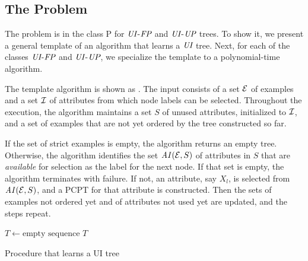 \vspace{-0.1cm}
\subsection{The  Problem}
\vspace{-0.1cm}

The  problem is in the class P for $\textit{UI}$-$\textit{FP}$ and
$\textit{UI}$-$\textit{UP}$ trees. To show it, we present a general template of an 
algorithm that learns a $\textit{UI}$ tree. Next, for each of the classes 
$\textit{UI}$-$\textit{FP}$ and $\textit{UI}$-$\textit{UP}$, we specialize the template to a 
polynomial-time algorithm.

The template algorithm is shown as . The 
input consists of a set $\mathcal{E}$ of examples and a set $\mathcal{I}$ of attributes 
from which node labels can be selected. Throughout the execution, the 
algorithm maintains a set $S$ of unused attributes, initialized to $\mathcal{I}$, 
and a set of examples that are not yet ordered by the tree constructed 
so far.

If the set of strict examples is empty, the algorithm returns an empty tree. 
Otherwise, the algorithm identifies the set $\mathit{AI}(\mathcal{E},S)$ of attributes in 
$S$ that are \emph{available} for selection as the label for the next 
node. If that set is empty, the algorithm terminates with failure. If
not, an attribute, say $X_l$, is selected from $\mathit{AI}(\mathcal{E},S)$, and a PCPT for
that attribute is constructed. Then the sets of examples not ordered yet 
and of attributes not used yet are updated, and the steps repeat.  

\begin{algorithm}[ht]

	$T \leftarrow \mbox{empty sequence}$\;
        \Return $T$\;
\caption{Procedure  that learns a UI tree 
\label{alg:learnUI}}
\end{algorithm}

